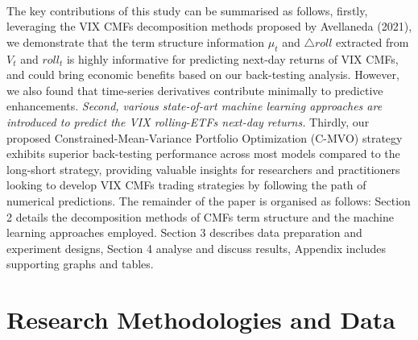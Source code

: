 \documentclass[10pt,letterpaper]{article}
\begin{document}
\\The key contributions of this study can be summarised as follows,  firstly, leveraging the VIX CMFs decomposition methods proposed by Avellaneda (2021), we demonstrate that the term structure information \(\mu_t\) and \(\triangle roll\) extracted from \(V_t\) and \(roll_t\) is highly informative for predicting next-day returns of VIX CMFs, and could bring economic benefits based on our back-testing analysis. However, we also found that time-series derivatives contribute minimally to predictive enhancements. \textit{Second, various state-of-art machine learning approaches are introduced to predict the VIX rolling-ETFs next-day returns.} Thirdly, our proposed Constrained-Mean-Variance Portfolio Optimization (C-MVO) strategy exhibits superior back-testing performance across most models compared to the long-short strategy, providing valuable insights for researchers and practitioners looking to develop VIX CMFs trading strategies by following the path of numerical predictions. The remainder of the paper is organised as follows: Section 2 details the decomposition methods of CMFs term structure and the machine learning approaches employed.  Section 3 describes data preparation and experiment designs, Section 4 analyse and discuss results, Appendix includes supporting graphs and tables.



\section*{Research Methodologies and Data}
\end{document}
